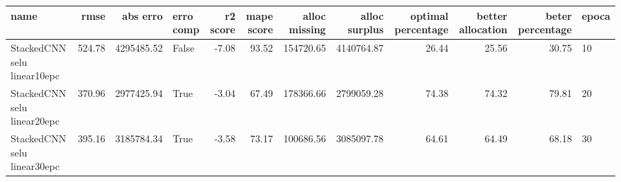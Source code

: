 \begin{tabular}{lrrlrrrrrrrl}
\toprule
name & rmse & abs erro & erro comp & r2 score & mape score & alloc missing & alloc surplus & optimal percentage & better allocation & beter percentage & epoca \\
\midrule
StackedCNN selu linear10epc & 524.78 & 4295485.52 & False & -7.08 & 93.52 & 154720.65 & 4140764.87 & 26.44 & 25.56 & 30.75 & 10 \\
StackedCNN selu linear20epc & 370.96 & 2977425.94 & True & -3.04 & 67.49 & 178366.66 & 2799059.28 & 74.38 & 74.32 & 79.81 & 20 \\
StackedCNN selu linear30epc & 395.16 & 3185784.34 & True & -3.58 & 73.17 & 100686.56 & 3085097.78 & 64.61 & 64.49 & 68.18 & 30 \\
\bottomrule
\end{tabular}
